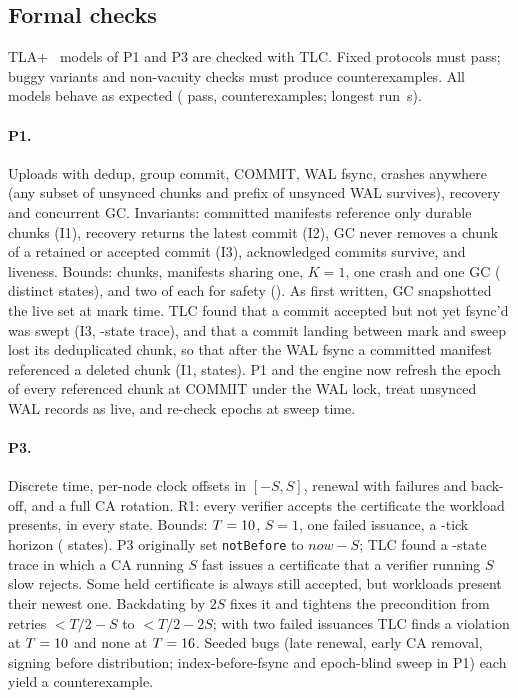 \subsection{Formal checks}
\label{sec:ext-formal}

TLA+~\citep{tla} models of P1 and P3 are checked with TLC. Fixed protocols must pass; buggy variants and
non-vacuity checks must produce counterexamples. All \CtlcModels{} models behave as expected
(\CtlcPassing{} pass, \CtlcViolating{} counterexamples; longest run \CtlcMaxWall\,s).

\paragraph{P1.} Uploads with dedup, group commit, COMMIT, WAL fsync, crashes anywhere (any subset of
unsynced chunks and prefix of unsynced WAL survives), recovery and concurrent GC. Invariants: committed
manifests reference only durable chunks (I1), recovery returns the latest commit (I2), GC never removes a
chunk of a retained or accepted commit (I3), acknowledged commits survive, and liveness. Bounds:  chunks,
 manifests sharing one, $K=1$, one crash and one GC (\CtlcPoneFixedStates{} distinct states), and
two of each for safety (\CtlcPoneBigStates). As first written, GC snapshotted the live set at mark time.
TLC found that a commit accepted but not yet fsync'd was swept (I3, \CtlcPoneAsWrittenTrace-state trace), and
that a commit landing between mark and sweep lost its deduplicated chunk, so that after the WAL fsync a
committed manifest referenced a deleted chunk (I1, \CtlcPoneAsWrittenCommittedTrace{} states). P1 and the
engine now refresh the epoch of every referenced chunk at COMMIT under the WAL lock, treat unsynced WAL
records as live, and re-check epochs at sweep time.

\paragraph{P3.} Discrete time, per-node clock offsets in $[-S,S]$, renewal with failures and back-off, and a
full CA rotation. R1: every verifier
accepts the certificate the workload presents, in every state. Bounds: $T=10$, $S=1$, one failed
issuance, a -tick horizon (\CtlcPthreeFixedStates{} states). P3 originally set \texttt{notBefore}
to $\textit{now}-S$; TLC found a \CtlcPthreeAsWrittenTrace-state trace in which a CA running $S$ fast
issues a certificate that a verifier running $S$ slow rejects. Some held certificate is always still
accepted, but workloads present their newest one. Backdating by $2S$ fixes it and tightens the
precondition from retries $<T/2-S$ to $<T/2-2S$; with two failed issuances TLC finds a violation at
$T=10$ and none at $T=16$. Seeded bugs (late renewal, early CA removal, signing before distribution;
index-before-fsync and epoch-blind sweep in P1) each yield a counterexample.

